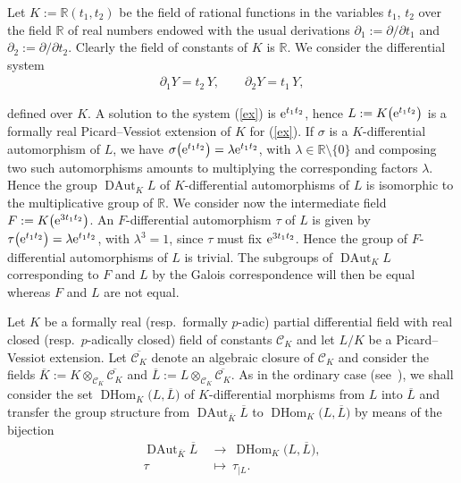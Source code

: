 \documentclass[10pt,a4paper]{amsart}
\numberwithin{equation}{section}
\newcommand{\R}{\mathbb{R}}
\def \DAut{\operatorname{DAut}}
\def \DHom{\operatorname{DHom}}
\begin{document}
\begin{Example} Let $K:=\R(t_1,t_2)$ be the field of rational functions in the variables $t_1$, $t_2$ over the field $\R$ of real numbers endowed with the usual derivations $\partial_1:= \partial /\partial t_1$ and $\partial_2:= \partial /\partial t_2$. Clearly the field of constants of $K$ is $\R$. We consider the differential system
\begin{gather}\label{ex}
\partial_1 Y= t_2 \, Y, \qquad \partial_2 Y= t_1 \, Y,
\end{gather}

\noindent
defined over $K$. A solution to the system (\ref{ex}) is ${\rm e}^{t_1t_2}$, hence $L:=K\big({\rm e}^{t_1t_2}\big)$ is a formally real Picard--Vessiot extension of $K$ for (\ref{ex}). If $\sigma$ is a $K$-differential automorphism of $L$, we have $\sigma\big({\rm e}^{t_1t_2}\big)=\lambda {\rm e}^{t_1t_2}$, with $\lambda \in \R\setminus \{0\}$ and composing two such automorphisms amounts to multiplying the corresponding factors $\lambda$. Hence the group $\DAut_K L$ of $K$-differential automorphisms of $L$ is isomorphic to the multiplicative group of $\R$. We consider now the intermediate field $F:=K\big({\rm e}^{3t_1t_2}\big)$. An $F$-differential automorphism $\tau$ of $L$ is given by $\tau\big({\rm e}^{t_1t_2}\big)=\lambda {\rm e}^{t_1t_2}$, with $\lambda^3=1$, since $\tau$ must fix ${\rm e}^{3t_1t_2}$. Hence the group of $F$-differential automorphisms of $L$ is trivial. The subgroups of $\DAut_K L$ corresponding to $F$ and $L$ by the Galois correspondence will then be equal whereas $F$ and $L$ are not equal.
\end{Example}


Let $K$ be a formally real (resp.\ formally $p$-adic) partial differential field with real closed (resp.\ $p$-adically closed)
field of constants $\mathcal{C}_K$ and let $L/K$ be a Picard--Vessiot extension. Let $\overline{\mathcal{C}_K}$ denote an algebraic closure of $\mathcal{C}_K$ and consider the fields $\overline{K}:=K\otimes_{\mathcal{C}_K} \overline{\mathcal{C}_K}$ and $\overline{L}:=L\otimes_{\mathcal{C}_K} \overline{\mathcal{C}_K}$. As
in the ordinary case (see~\cite{CHSA}), we shall consider the set
$\DHom_K\big(L,\overline{L}\big)$ of $K$-differential morphisms from $L$ into
$\overline{L}$ and transfer the group structure from $\DAut_{\overline{K}} \overline{L}$ to
$\DHom_K\big(L,\overline{L}\big)$ by means of the bijection
\begin{align*}
\DAut_{\overline{K}} \overline{L} &\ \rightarrow \ \DHom_K\big(L,\overline{L}\big),
\\
\tau &\ \mapsto \ \tau_{|L}.
\end{align*}
\end{document}

